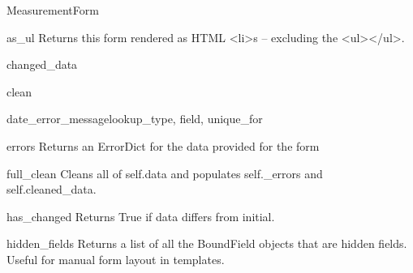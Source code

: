 \documentclass[letterpaper,10pt,english]{sphinxmanual}
\begin{document}
\begin{classdesc}{MeasurementForm}
\hypertarget{data.forms.MeasurementForm.as_ul}{}\begin{methoddesc}[MeasurementForm]{as\_ul}{}
Returns this form rendered as HTML \textless{}li\textgreater{}s -- excluding the \textless{}ul\textgreater{}\textless{}/ul\textgreater{}.
\end{methoddesc}

\hypertarget{data.forms.MeasurementForm.changed_data}{}\begin{memberdesc}[MeasurementForm]{changed\_data}\end{memberdesc}

\hypertarget{data.forms.MeasurementForm.clean}{}\begin{methoddesc}[MeasurementForm]{clean}{}\end{methoddesc}

\hypertarget{data.forms.MeasurementForm.date_error_message}{}\begin{methoddesc}[MeasurementForm]{date\_error\_message}{lookup\_type, field, unique\_for}\end{methoddesc}

\hypertarget{data.forms.MeasurementForm.errors}{}\begin{memberdesc}[MeasurementForm]{errors}
Returns an ErrorDict for the data provided for the form
\end{memberdesc}

\hypertarget{data.forms.MeasurementForm.full_clean}{}\begin{methoddesc}[MeasurementForm]{full\_clean}{}
Cleans all of self.data and populates self.\_errors and
self.cleaned\_data.
\end{methoddesc}

\hypertarget{data.forms.MeasurementForm.has_changed}{}\begin{methoddesc}[MeasurementForm]{has\_changed}{}
Returns True if data differs from initial.
\end{methoddesc}

\hypertarget{data.forms.MeasurementForm.hidden_fields}{}\begin{methoddesc}[MeasurementForm]{hidden\_fields}{}
Returns a list of all the BoundField objects that are hidden fields.
Useful for manual form layout in templates.
\end{methoddesc}


\end{classdesc}
\end{document}
